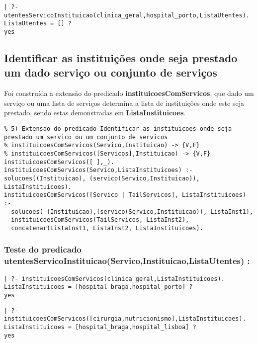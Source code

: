 \documentclass[
  oneside,
  10pt, a4paper,
  footinclude=true,
  headinclude=true,
  cleardoublepage=empty
]{scrbook}
\begin{document}
\begin{lstlisting}
| ?- utentesServicoInstituicao(clinica_geral,hospital_porto,ListaUtentes).
ListaUtentes = [] ? 
yes
\end{lstlisting}















\subsection{Identificar as instituições onde seja prestado um dado serviço ou conjunto de serviços}


Foi construída a extensão do predicado \textbf{instituicoesComServicos}, que dado um serviço ou uma lista de serviços determina a lista de instituições onde este seja prestado, sendo estas demonstradas em \textbf{ListaInstituicoes}.\par 
\begin{lstlisting}
% 5) Extensao do predicado Identificar as instituicoes onde seja prestado um servico ou um conjunto de servicos
% instituicoesComServicos(Servico,Instituicao) -> {V,F}
% instituicoesComServicos([Servicos],Instituicao) -> {V,F}
instituicoesComServicos([ ],_).
instituicoesComServicos(Servico,ListaInstituicoes) :- solucoes((Instituicao), (servico(Servico,Instituicao)), ListaInstituicoes).
instituicoesComServicos([Servico | TailServicos], ListaInstituicoes) :-
  solucoes( (Instituicao),(servico(Servico,Instituicao)), ListaInst1),
  instituicoesComServicos(TailServicos, ListaInst2),
  concatenar(ListaInst1, ListaInst2, ListaInstituicoes).
\end{lstlisting}


\subsubsection{Teste do predicado \textbf{utentesServicoInstituicao(Servico,Instituicao,ListaUtentes) }:}

\begin{lstlisting}
| ?- instituicoesComServicos(clinica_geral,ListaInstituicoes).
ListaInstituicoes = [hospital_braga,hospital_porto] ? 
yes
\end{lstlisting}

\begin{lstlisting}
| ?- instituicoesComServicos([cirurgia,nutricionismo],ListaInstituicoes).
ListaInstituicoes = [hospital_braga,hospital_lisboa] ?
yes
\end{lstlisting}
\end{document}

